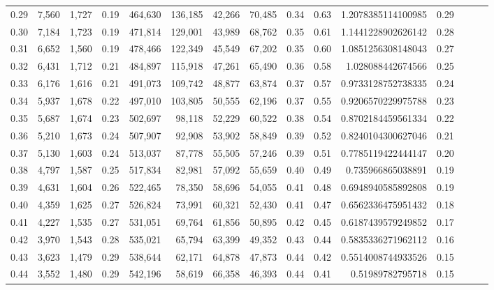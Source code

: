 \begin{tabular}{rrrrrrrrrrrrrrr}
0.29 &   7,560 &  1,727 &  0.19 &  464,630 &  136,185 &   42,266 &   70,485 &  0.34 &  0.63 &    1.2078385114100985 &      0.29 \\
0.30 &   7,184 &  1,723 &  0.19 &  471,814 &  129,001 &   43,989 &   68,762 &  0.35 &  0.61 &    1.1441228902626142 &      0.28 \\
0.31 &   6,652 &  1,560 &  0.19 &  478,466 &  122,349 &   45,549 &   67,202 &  0.35 &  0.60 &    1.0851256308148043 &      0.27 \\
0.32 &   6,431 &  1,712 &  0.21 &  484,897 &  115,918 &   47,261 &   65,490 &  0.36 &  0.58 &     1.028088442674566 &      0.25 \\
0.33 &   6,176 &  1,616 &  0.21 &  491,073 &  109,742 &   48,877 &   63,874 &  0.37 &  0.57 &    0.9733128752738335 &      0.24 \\
0.34 &   5,937 &  1,678 &  0.22 &  497,010 &  103,805 &   50,555 &   62,196 &  0.37 &  0.55 &    0.9206570229975788 &      0.23 \\
0.35 &   5,687 &  1,674 &  0.23 &  502,697 &   98,118 &   52,229 &   60,522 &  0.38 &  0.54 &    0.8702184459561334 &      0.22 \\
0.36 &   5,210 &  1,673 &  0.24 &  507,907 &   92,908 &   53,902 &   58,849 &  0.39 &  0.52 &    0.8240104300627046 &      0.21 \\
0.37 &   5,130 &  1,603 &  0.24 &  513,037 &   87,778 &   55,505 &   57,246 &  0.39 &  0.51 &    0.7785119422444147 &      0.20 \\
0.38 &   4,797 &  1,587 &  0.25 &  517,834 &   82,981 &   57,092 &   55,659 &  0.40 &  0.49 &     0.735966865038891 &      0.19 \\
0.39 &   4,631 &  1,604 &  0.26 &  522,465 &   78,350 &   58,696 &   54,055 &  0.41 &  0.48 &    0.6948940585892808 &      0.19 \\
0.40 &   4,359 &  1,625 &  0.27 &  526,824 &   73,991 &   60,321 &   52,430 &  0.41 &  0.47 &    0.6562336475951432 &      0.18 \\
0.41 &   4,227 &  1,535 &  0.27 &  531,051 &   69,764 &   61,856 &   50,895 &  0.42 &  0.45 &    0.6187439579249852 &      0.17 \\
0.42 &   3,970 &  1,543 &  0.28 &  535,021 &   65,794 &   63,399 &   49,352 &  0.43 &  0.44 &    0.5835336271962112 &      0.16 \\
0.43 &   3,623 &  1,479 &  0.29 &  538,644 &   62,171 &   64,878 &   47,873 &  0.44 &  0.42 &    0.5514008744933526 &      0.15 \\
0.44 &   3,552 &  1,480 &  0.29 &  542,196 &   58,619 &   66,358 &   46,393 &  0.44 &  0.41 &      0.51989782795718 &      0.15 \\

\end{tabular}
